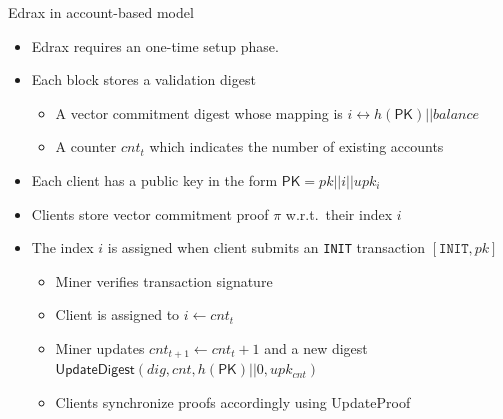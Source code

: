 \documentclass[biblatex,aspectratio=169,11pt]{mybeamer}
\begin{document}
\begin{frame}{Edrax in account-based model}
  \vspace{-2em}
  \begin{itemize}
    \item Edrax requires an \alert{one-time setup phase}. 
      \item Each block stores a validation digest
        \begin{itemize}
          \item A vector commitment digest whose mapping is $i \leftrightarrow h(\textsf{PK}) || balance$
          \item A counter $cnt_t$ which indicates the number of existing accounts
        \end{itemize}
      \item Each client has a public key in the form $\textsf{PK} = pk || i || upk_i$
      \item Clients store vector commitment proof $\pi$ w.r.t.\ their index $i$
      \item The index $i$ is assigned when client submits an \alert{\texttt{INIT} transaction} $[\texttt{INIT}, pk]$
        \begin{itemize}
          \item Miner verifies transaction signature
          \item Client is assigned to $i \gets cnt_t$
          \item Miner updates $cnt_{t+1} \gets cnt_t + 1$ and a new digest \\
            $\textsf{UpdateDigest}(dig, cnt, h(\textsf{PK}) || 0, upk_{cnt})$
          \item Clients synchronize proofs accordingly using UpdateProof
        \end{itemize}
  \end{itemize}
\end{frame}
\end{document}

